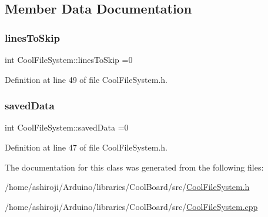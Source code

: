 \subsection{Member Data Documentation}
\mbox{\label{class_cool_file_system_a84fdb6057e534b395512463daa28ea3c}} 
\subsubsection{\texorpdfstring{lines\+To\+Skip}{linesToSkip}}
{\footnotesize\ttfamily int Cool\+File\+System\+::lines\+To\+Skip =0\hspace{0.3cm}{\ttfamily [private]}}



Definition at line 49 of file Cool\+File\+System.\+h.

\mbox{\label{class_cool_file_system_ad9f5b739a32100f5f21270c3d9ee2b1d}} 
\subsubsection{\texorpdfstring{saved\+Data}{savedData}}
{\footnotesize\ttfamily int Cool\+File\+System\+::saved\+Data =0\hspace{0.3cm}{\ttfamily [private]}}



Definition at line 47 of file Cool\+File\+System.\+h.



The documentation for this class was generated from the following files\+:\begin{DoxyCompactItemize}
\item 
/home/ashiroji/\+Arduino/libraries/\+Cool\+Board/src/\hyperlink{_cool_file_system_8h}{Cool\+File\+System.\+h}\item 
/home/ashiroji/\+Arduino/libraries/\+Cool\+Board/src/\hyperlink{_cool_file_system_8cpp}{Cool\+File\+System.\+cpp}\end{DoxyCompactItemize}
